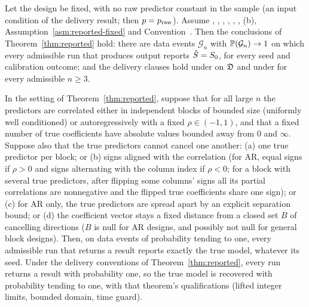 \begin{theorem}\label{thm:reported-fixed}
Let the design be fixed, with no raw predictor constant in the sample (an input condition of the delivery result; then
$p=\praw$). Assume , , , ,
, , (b), Assumption~\ref{asm:reported-fixed} and Convention~. Then the conclusions of
Theorem~\ref{thm:reported} hold: there are data events $\mathcal G_n$ with $\P(\mathcal G_n)\to1$ on which every
admissible run that produces output reports $\Shat=\Sz$, for every seed and calibration outcome; and the delivery
clauses hold under  on $\Dom$ and under  for every admissible $n\ge3$.
\end{theorem}



\begin{corollary}\label{cor:famc}
In the setting of Theorem~\ref{thm:reported}, suppose that for all large $n$ the predictors are correlated either in
independent blocks of bounded size (uniformly well conditioned) or autoregressively with a fixed $\rho\in(-1,1)$, and that
a fixed number of true coefficients have absolute values bounded away from $0$ and $\infty$. Suppose also that the true
predictors cannot cancel one another: (a) one true predictor per block; or (b) signs aligned with the correlation (for AR,
equal signs if $\rho>0$ and signs alternating with the column index if $\rho<0$; for a block with several true predictors,
after flipping some columns' signs all its partial correlations are nonnegative and the flipped true coefficients share
one sign); or (c) for AR only, the true predictors are spread apart by an explicit separation bound; or (d) the coefficient
vector stays a fixed distance from a closed set $B$ of cancelling directions ($B$ is null for AR designs, and possibly not
null for general block designs). Then, on data events of probability tending to one, every admissible run that returns a
result reports exactly the true model, whatever its seed. Under the delivery conventions of Theorem~\ref{thm:reported},
every run returns a result with probability one, so the true model is recovered with probability tending to one, with
that theorem's qualifications (lifted integer limits, bounded domain, time guard).
\end{corollary}

